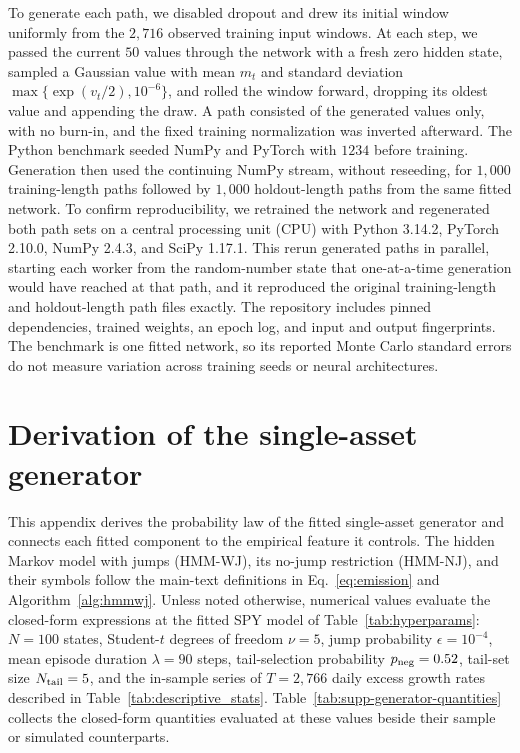 To generate each path, we disabled dropout and drew its initial
window uniformly from the $2{,}716$ observed training input windows.
At each step, we passed the current $50$ values through the network
with a fresh zero hidden state, sampled a Gaussian value with mean
$m_t$ and standard deviation $\max\{\exp(v_t/2),10^{-6}\}$, and
rolled the window forward, dropping its oldest value and appending
the draw. A path consisted of the generated values only, with no
burn-in, and the fixed training normalization was inverted afterward.
The Python benchmark seeded NumPy and PyTorch with $1234$ before
training. Generation then used the continuing NumPy stream, without
reseeding, for $1{,}000$ training-length paths followed by $1{,}000$
holdout-length paths from the same fitted network.
To confirm reproducibility, we retrained the network and regenerated
both path sets on a central processing unit (CPU) with Python 3.14.2,
PyTorch 2.10.0, NumPy 2.4.3, and SciPy 1.17.1. This rerun generated
paths in parallel, starting each worker from the random-number state
that one-at-a-time generation would have reached at that path, and it
reproduced the original training-length and holdout-length path
files exactly. The repository includes pinned dependencies, trained
weights, an epoch log, and input and output fingerprints. The
benchmark is one fitted network, so its reported Monte Carlo standard
errors do not measure variation across training seeds or neural
architectures.


\section{Derivation of the single-asset generator}
\label{sec:supp-generator}

This appendix derives the probability law of the fitted single-asset
generator and connects each fitted component to the empirical feature
it controls. The hidden Markov model with jumps (HMM-WJ), its no-jump
restriction (HMM-NJ), and their symbols follow the main-text
definitions in Eq.~\eqref{eq:emission} and
Algorithm~\ref{alg:hmmwj}. Unless noted otherwise, numerical values
evaluate the closed-form expressions at the fitted SPY model of
Table~\ref{tab:hyperparams}: $N = 100$ states, Student-$t$ degrees of
freedom $\nu = 5$, jump probability $\epsilon = 10^{-4}$, mean episode
duration $\lambda = 90$ steps, tail-selection probability
$p_{\rm neg} = 0.52$, tail-set size $N_{\rm tail} = 5$, and the
in-sample series of $T = 2{,}766$ daily excess growth rates described
in Table~\ref{tab:descriptive_stats}.
Table~\ref{tab:supp-generator-quantities} collects the closed-form
quantities evaluated at these values beside their sample or simulated
counterparts.

